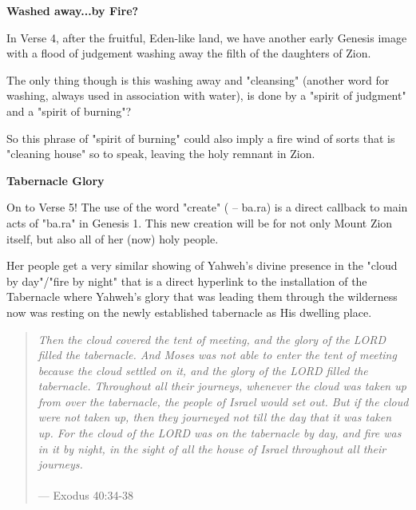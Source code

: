 \documentclass[11pt]{article}
\begin{document}
\vspace{3em}
{\large\bfseries Washed away...by Fire?}
\vspace{1em}

In Verse 4, after the fruitful, Eden-like land, we have another early Genesis image with a flood of judgement washing away the filth of the daughters of Zion.

{\vspace{1em}}

The only thing though is this washing away and "cleansing" (another word for washing, always used in association with water), is done by a "spirit of judgment" and a "spirit of burning"?

{\vspace{1em}}


So this phrase of "spirit of burning" could also imply a fire wind of sorts that is "cleaning house" so to speak, leaving the holy remnant in Zion.


\vspace{3em}
{\large\bfseries Tabernacle Glory}
\vspace{1em}



On to Verse 5! The use of the word "create" ( – ba.ra) is a direct callback to main acts of "ba.ra" in Genesis 1.
This new creation will be for not only Mount Zion itself, but also all of her (now) holy people.

{\vspace{1em}}

Her people get a very similar showing of Yahweh's divine presence in the "cloud by day"/"fire by night" that is a direct hyperlink to the installation of the Tabernacle where
Yahweh's glory that was leading them through the wilderness now was resting on the newly established tabernacle as His dwelling place.

\begin{quote}
\textit{
Then the cloud covered the tent of meeting, and the glory of the LORD filled the tabernacle.
And Moses was not able to enter the tent of meeting because the cloud settled on it, and the glory of the LORD filled the tabernacle. 
Throughout all their journeys, whenever the cloud was taken up from over the tabernacle, the people of Israel would set out. 
But if the cloud were not taken up, then they journeyed not till the day that it was taken up.
For the cloud of the LORD was on the tabernacle by day, and fire was in it by night, in the sight of all the house of Israel throughout all their journeys.
}
\\\\
\hfill --- Exodus 40:34-38
\end{quote}
\end{document}
